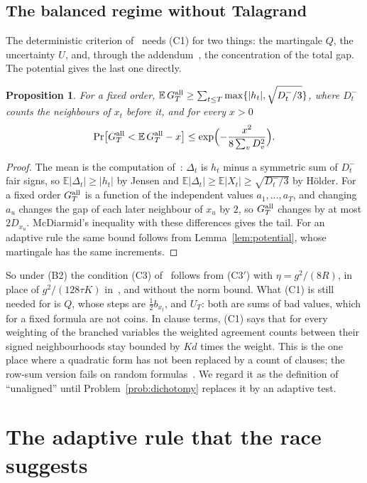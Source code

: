 \documentclass[11pt,a4paper]{article}
\newtheorem{proposition}[theorem]{Proposition}
\theoremstyle{definition}
\theoremstyle{remark}
\newcommand{\E}{\mathbb{E}}
\begin{document}
\subsection{The balanced regime without Talagrand}\label{sec:balanced}

The deterministic criterion of~\cite{CC} needs (C1) for two things: the
martingale $Q$, the uncertainty $U$, and, through the addendum~\cite{CA}, the
concentration of the total gap. The potential gives the last one directly.

\begin{proposition}\label{prop:gaps-balanced}
For a fixed order, $\E\,G^{\rm all}_T\ge\sum_{t\le T}\max\{|h_t|,\sqrt{D^-_t/3}\}$,
where $D^-_t$ counts the neighbours of $x_t$ before it, and for every $x>0$
\[
 \Pr\bigl[G^{\rm all}_T<\E\,G^{\rm all}_T-x\bigr]\le\exp\Bigl(-\frac{x^2}{8\sum_vD_v^2}\Bigr).
\]
\end{proposition}

\begin{proof}
The mean is the computation of~\cite[Proposition~1]{CA}: $\Delta_t$ is $h_t$
minus a symmetric sum of $D^-_t$ fair signs, so $\E|\Delta_t|\ge|h_t|$ by
Jensen and $\E|\Delta_t|\ge\E|X_t|\ge\sqrt{D^-_t/3}$ by H\"older. For a fixed
order $G^{\rm all}_T$ is a function of the independent values $a_1,\dots,a_T$,
and changing $a_u$ changes the gap of each later neighbour of $x_u$ by $2$, so
$G^{\rm all}_T$ changes by at most $2D_{x_u}$. McDiarmid's inequality with
these differences gives the tail. For an adaptive rule the same bound follows
from Lemma~\ref{lem:potential}, whose martingale has the same increments.
\end{proof}

So under (B2) the condition (C3) of~\cite{CC} follows from (C3$'$) with
$\eta=g^2/(8R)$, in place of $g^2/(128\tau K)$ in~\cite{CA}, and without the
norm bound. What (C1) is still needed for is $Q$, whose steps are
$\frac12b_{x_t}$, and $U_T$: both are sums of bad values, which for a fixed
formula are not coins. In clause terms, (C1) says that for every weighting of
the branched variables the weighted agreement counts between their signed
neighbourhoods stay bounded by $Kd$ times the weight. This is the one place
where a quadratic form has not been replaced by a count of clauses; the
row-sum version fails on random formulas~\cite[Remark~5]{CA}. We regard it as
the definition of ``unaligned'' until Problem~\ref{prob:dichotomy} replaces it
by an adaptive test.

\section{The adaptive rule that the race suggests}\label{sec:adaptive}
\end{document}
